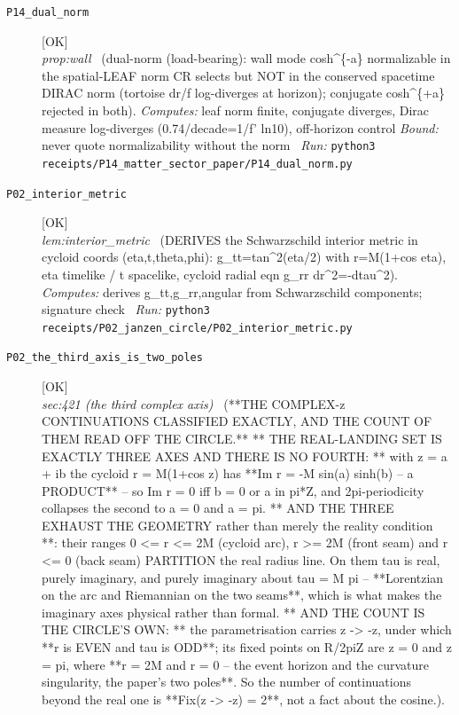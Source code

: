 \begin{description}
\item[\label{rcpt:P14_dual_norm}\texttt{P14\_dual\_norm}]\hfill\textsf{[OK]}\\
\textit{prop:wall} \ (dual-norm (load-bearing): wall mode cosh\textasciicircum{}\{-a\} normalizable in the spatial-LEAF norm CR selects but NOT in the conserved spacetime DIRAC norm (tortoise dr/f log-diverges at horizon); conjugate cosh\textasciicircum{}\{+a\} rejected in both). 
\emph{Computes:} leaf norm finite, conjugate diverges, Dirac measure log-diverges (0.74/decade=1/f' ln10), off-horizon control
 \emph{Bound:} never quote normalizability without the norm
\ \emph{Run:} \texttt{python3 receipts/P14\_matter\_sector\_paper/P14\_dual\_norm.py}
\item[\label{rcpt:P02_interior_metric}\texttt{P02\_interior\_metric}]\hfill\textsf{[OK]}\\
\textit{lem:interior\_metric} \ (DERIVES the Schwarzschild interior metric in cycloid coords (eta,t,theta,phi): g\_tt=tan\textasciicircum{}2(eta/2) with r=M(1+cos eta), eta timelike / t spacelike, cycloid radial eqn g\_rr dr\textasciicircum{}2=-dtau\textasciicircum{}2). 
\emph{Computes:} derives g\_tt,g\_rr,angular from Schwarzschild components; signature check
\ \emph{Run:} \texttt{python3 receipts/P02\_janzen\_circle/P02\_interior\_metric.py}
\item[\label{rcpt:P02_the_third_axis_is_two_poles}\texttt{P02\_the\_third\_axis\_is\_two\_poles}]\hfill\textsf{[OK]}\\
\textit{sec:421 (the third complex axis)} \ (**THE COMPLEX-z CONTINUATIONS CLASSIFIED EXACTLY, AND THE COUNT OF THEM READ OFF THE CIRCLE.** ** THE REAL-LANDING SET IS EXACTLY THREE AXES AND THERE IS NO FOURTH: ** with z = a + ib the cycloid r = M(1+cos z) has **Im r = -M sin(a) sinh(b) -- a PRODUCT** -- so Im r = 0 iff b = 0 or a in pi*Z, and 2pi-periodicity collapses the second to a = 0 and a = pi. ** AND THE THREE EXHAUST THE GEOMETRY rather than merely the reality condition **: their ranges 0 <= r <= 2M (cycloid arc), r >= 2M (front seam) and r <= 0 (back seam) PARTITION the real radius line. On them tau is real, purely imaginary, and purely imaginary about tau = M pi -- **Lorentzian on the arc and Riemannian on the two seams**, which is what makes the imaginary axes physical rather than formal. ** AND THE COUNT IS THE CIRCLE'S OWN: ** the parametrisation carries z -> -z, under which **r is EVEN and tau is ODD**; its fixed points on R/2piZ are z = 0 and z = pi, where **r = 2M and r = 0 -- the event horizon and the curvature singularity, the paper's two poles**. So the number of continuations beyond the real one is **\textbar{}Fix(z -> -z)\textbar{} = 2**, not a fact about the cosine.). 

\end{description}
